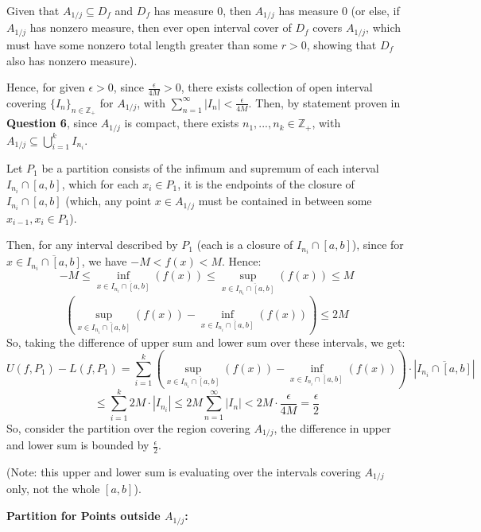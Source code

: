 \documentclass{article}
\begin{document}
\begin{itemize}
    \hfill

    Given that $A_{1/j}\subseteq D_f$ and $D_f$ has measure $0$, then $A_{1/j}$ has measure $0$ (or else, if $A_{1/j}$ has nonzero measure, then ever open interval cover of $D_f$ covers $A_{1/j}$, which must have some nonzero total length greater than some $r>0$, showing that $D_f$ also has nonzero measure).

    Hence, for given $\epsilon>0$, since $\frac{\epsilon}{4M}>0$, there exists collection of open interval covering $\{I_n\}_{n\in\mathbb{Z}_+}$ for $A_{1/j}$, with $\sum_{n=1}^{\infty}|I_n|<\frac{\epsilon}{4M}$.
    Then, by statement proven in \textbf{Question 6}, since $A_{1/j}$ is compact, there exists $n_1,...,n_k\in\mathbb{Z}_+$, with $A_{1/j}\subseteq \bigcup_{i=1}^{k}I_{n_i}$.

    Let $P_1$ be a partition consists of the infimum and supremum of each interval $I_{n_i}\cap [a,b]$, which for each $x_i\in P_1$,
    it is the endpoints of the closure of $I_{n_i}\cap [a,b]$ (which, any point $x\in A_{1/j}$ must be contained in between some $x_{i-1},x_i\in P_1$).

    \hfill

    Then, for any interval described by $P_1$ (each is a closure of $I_{n_i}\cap [a,b]$), since for $x\in \overline{I_{n_i}\cap[a,b]}$, we have $-M<f(x)<M$. Hence:
    $$-M\leq \inf_{x\in \overline{I_{n_i}\cap[a,b]}}(f(x))\leq \sup_{x\in \overline{I_{n_i}\cap[a,b]}}(f(x))\leq M$$
    $$\left(\sup_{x\in \overline{I_{n_i}\cap[a,b]}}(f(x))-\inf_{x\in \overline{I_{n_i}\cap[a,b]}}(f(x))\right)\leq 2M$$
    So, taking the difference of upper sum and lower sum over these intervals, we get:
    $$U(f,P_1)-L(f,P_1)=\sum_{i=1}^{k}\left(\sup_{x\in \overline{I_{n_i}\cap[a,b]}}(f(x))-\inf_{x\in \overline{I_{n_i}\cap[a,b]}}(f(x))\right)\cdot |\overline{I_{n_i}\cap[a,b]}|$$
    $$\leq \sum_{i=1}^{k}2M \cdot |I_{n_i}| \leq 2M\sum_{n=1}^{\infty}|I_n| < 2M\cdot \frac{\epsilon}{4M}=\frac{\epsilon}{2}$$
    So, consider the partition over the region covering $A_{1/j}$, the difference in upper and lower sum is bounded by $\frac{\epsilon}{2}$.

    (Note: this upper and lower sum is evaluating over the intervals covering $A_{1/j}$ only, not the whole $[a,b]$).

    \hfill

    \textbf{Partition for Points outside $A_{1/j}$:}


\end{itemize}
\end{document}
